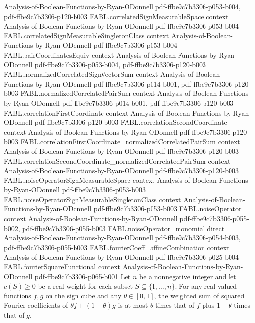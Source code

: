 \begin{theorem}
  {Analysis-of-Boolean-Functions-by-Ryan-ODonnell}
  {pdf-ffbe9c7b3306-p053-b004,
    pdf-ffbe9c7b3306-p120-b003}
\proofstep
  {FABL.correlatedSignMeasurableSpace}
  {context}
  {Analysis-of-Boolean-Functions-by-Ryan-ODonnell}
  {pdf-ffbe9c7b3306-p053-b004}
\proofstep
  {FABL.correlatedSignMeasurableSingletonClass}
  {context}
  {Analysis-of-Boolean-Functions-by-Ryan-ODonnell}
  {pdf-ffbe9c7b3306-p053-b004}
\proofstep
  {FABL.pairCoordinatesEquiv}
  {context}
  {Analysis-of-Boolean-Functions-by-Ryan-ODonnell}
  {pdf-ffbe9c7b3306-p053-b004,
    pdf-ffbe9c7b3306-p120-b003}
\proofstep
  {FABL.normalizedCorrelatedSignVectorSum}
  {context}
  {Analysis-of-Boolean-Functions-by-Ryan-ODonnell}
  {pdf-ffbe9c7b3306-p014-b001,
    pdf-ffbe9c7b3306-p120-b003}
\proofstep
  {FABL.normalizedCorrelatedPairSum}
  {context}
  {Analysis-of-Boolean-Functions-by-Ryan-ODonnell}
  {pdf-ffbe9c7b3306-p014-b001,
    pdf-ffbe9c7b3306-p120-b003}
\proofstep
  {FABL.correlationFirstCoordinate}
  {context}
  {Analysis-of-Boolean-Functions-by-Ryan-ODonnell}
  {pdf-ffbe9c7b3306-p120-b003}
\proofstep
  {FABL.correlationSecondCoordinate}
  {context}
  {Analysis-of-Boolean-Functions-by-Ryan-ODonnell}
  {pdf-ffbe9c7b3306-p120-b003}
\proofstep
  {FABL.correlationFirstCoordinate_normalizedCorrelatedPairSum}
  {context}
  {Analysis-of-Boolean-Functions-by-Ryan-ODonnell}
  {pdf-ffbe9c7b3306-p120-b003}
\proofstep
  {FABL.correlationSecondCoordinate_normalizedCorrelatedPairSum}
  {context}
  {Analysis-of-Boolean-Functions-by-Ryan-ODonnell}
  {pdf-ffbe9c7b3306-p120-b003}
\proofstep
  {FABL.noiseOperatorSignMeasurableSpace}
  {context}
  {Analysis-of-Boolean-Functions-by-Ryan-ODonnell}
  {pdf-ffbe9c7b3306-p053-b003}
\proofstep
  {FABL.noiseOperatorSignMeasurableSingletonClass}
  {context}
  {Analysis-of-Boolean-Functions-by-Ryan-ODonnell}
  {pdf-ffbe9c7b3306-p053-b003}
\proofstep
  {FABL.noiseOperator}
  {context}
  {Analysis-of-Boolean-Functions-by-Ryan-ODonnell}
  {pdf-ffbe9c7b3306-p055-b002,
    pdf-ffbe9c7b3306-p055-b003}
\proofstep
  {FABL.noiseOperator_monomial}
  {direct}
  {Analysis-of-Boolean-Functions-by-Ryan-ODonnell}
  {pdf-ffbe9c7b3306-p054-b003,
    pdf-ffbe9c7b3306-p055-b003}
\proofstep
  {FABL.fourierCoeff_affineCombination}
  {context}
  {Analysis-of-Boolean-Functions-by-Ryan-ODonnell}
  {pdf-ffbe9c7b3306-p025-b004}
\proofstep
  {FABL.fourierSquareFunctional}
  {context}
  {Analysis-of-Boolean-Functions-by-Ryan-ODonnell}
  {pdf-ffbe9c7b3306-p065-b001}
Let $n$ be a nonnegative integer and let $c(S)\ge 0$ be a real weight for each subset
$S\subseteq\{1,\ldots,n\}$. For any real-valued functions $f,g$ on the sign cube and any
$\theta\in[0,1]$, the weighted sum of squared Fourier coefficients of $\theta
f+(1-\theta)g$ is at most $\theta$ times that of $f$ plus $1-\theta$ times that of $g$.
\end{theorem}

